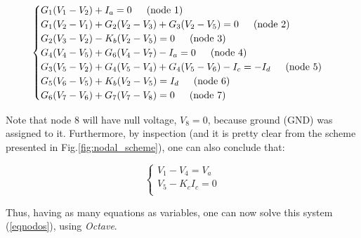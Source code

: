 \begin{equation}
    \begin{cases}
        G_1(V_1 - V_2) + I_a = 0 \hspace{15px} \text{(node 1)}\\
        G_1(V_2 - V_1) + G_2(V_2 - V_3) + G_3(V_2-V_5) = 0 \hspace{15px} \text{(node 2)}\\
        G_2(V_3 - V_2) - K_b(V_2 - V_5) = 0 \hspace{15px} \text{(node 3)}\\
        G_4(V_4 - V_5) + G_6(V_4 - V_7) - I_a = 0 \hspace{15px} \text{(node 4)}\\
        G_3(V_5 - V_2) + G_4(V_5 - V_4) + G_4(V_5 - V_6) - I_c = -I_d \hspace{15px} \text{(node 5)}\\
        G_5(V_6 - V_5) + K_b(V_2 - V_5) = I_d \hspace{15px} \text{(node 6)}\\
        G_6(V_7 - V_6) + G_7(V_7 - V_8) = 0 \hspace{15px} \text{(node 7)}\\
    \end{cases}
\end{equation}

Note that node 8 will have null voltage, $V_8=0$, because ground (GND) was assigned to it. Furthermore, by inspection (and it is pretty clear from the scheme presented in Fig.\ref{fig:nodal_scheme}), one can also conclude that:

\begin{equation}
    \begin{cases}
        V_1 - V_4 = V_a\\
        V_5 - K_cI_c = 0\\
    \end{cases}
\end{equation}

Thus, having as many equations as variables, one can now solve this system (\ref{eqnodos}), using \textit{Octave}.

